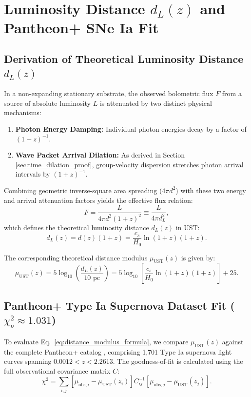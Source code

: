 \documentclass[11pt,a4paper]{article}
\begin{document}
	\section{Luminosity Distance $d_L(z)$ and Pantheon+ SNe Ia Fit}
	\label{sec:pantheon_fit}
	
	\subsection{Derivation of Theoretical Luminosity Distance $d_L(z)$}
	In a non-expanding stationary substrate, the observed bolometric flux $F$ from a source of absolute luminosity $L$ is attenuated by two distinct physical mechanisms:
	\begin{enumerate}
		\item \textbf{Photon Energy Damping:} Individual photon energies decay by a factor of $(1+z)^{-1}$.
		\item \textbf{Wave Packet Arrival Dilation:} As derived in Section \ref{sec:time_dilation_proof}, group-velocity dispersion stretches photon arrival intervals by $(1+z)^{-1}$.
	\end{enumerate}
	
	Combining geometric inverse-square area spreading ($4\pi d^2$) with these two energy and arrival attenuation factors yields the effective flux relation:
	\begin{equation}
		F = \frac{L}{4\pi d^2 (1 + z)^2} \equiv \frac{L}{4\pi d_L^2},
	\end{equation}
	which defines the theoretical luminosity distance $d_L(z)$ in UST:
	\begin{equation}
		d_L(z) = d(z) (1 + z) = \frac{c_s}{H_0} \ln(1 + z) (1 + z).
		\label{eq:luminosity_distance_ust}
	\end{equation}
	
	The corresponding theoretical distance modulus $\mu_{\text{UST}}(z)$ is given by:
	\begin{equation}
		\mu_{\text{UST}}(z) = 5 \log_{10}\left( \frac{d_L(z)}{10 \text{ pc}} \right) = 5 \log_{10}\left[ \frac{c_s}{H_0} \ln(1 + z) (1 + z) \right] + 25.
		\label{eq:distance_modulus_formula}
	\end{equation}
	
	\subsection{Pantheon+ Type Ia Supernova Dataset Fit ($\chi^2_\nu \approx 1.031$)}
	To evaluate Eq.\ \eqref{eq:distance_modulus_formula}, we compare $\mu_{\text{UST}}(z)$ against the complete Pantheon+ catalog \cite{PantheonPlus}, comprising 1,701 Type Ia supernova light curves spanning $0.0012 < z < 2.2613$. The goodness-of-fit is calculated using the full observational covariance matrix $C$:
	\begin{equation}
		\chi^2 = \sum_{i,j} \left[ \mu_{\text{obs},i} - \mu_{\text{UST}}(z_i) \right] C_{ij}^{-1} \left[ \mu_{\text{obs},j} - \mu_{\text{UST}}(z_j) \right].
	\end{equation}
	
\end{document}
